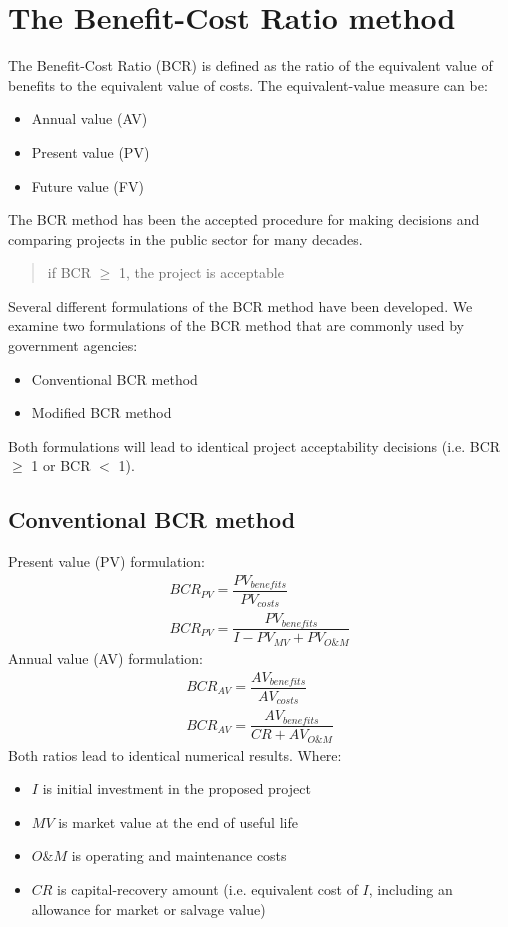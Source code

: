 \section{The Benefit-Cost Ratio method}
The Benefit-Cost Ratio (BCR) is defined as the ratio of the equivalent value of benefits to the equivalent value of costs. The equivalent-value measure can be:
\begin{itemize}
  \item Annual value (AV)
  \item Present value (PV)
  \item Future value (FV)
\end{itemize}
The BCR method has been the accepted procedure for making decisions and comparing projects in the public sector for many decades.
\begin{quote}
  if BCR $\geq$ 1, the project is acceptable
\end{quote}
Several different formulations of the BCR method have been developed. We examine two formulations of the BCR method that are commonly used by government agencies:
\begin{itemize}
  \item Conventional BCR method
  \item Modified BCR method
\end{itemize}
Both formulations will lead to identical project acceptability decisions (i.e. BCR $\geq$ 1 or BCR $<$ 1).
\subsection{Conventional BCR method}
Present value (PV) formulation:
\begin{gather}
  BCR_{PV} = \dfrac{PV_{benefits}}{PV_{costs}}\\
  BCR_{PV} = \dfrac{PV_{benefits}}{I- PV_{MV}+PV_{O\&M}}
\end{gather}
Annual value (AV) formulation:
\begin{gather}
  BCR_{AV} = \dfrac{AV_{benefits}}{AV_{costs}}\\
  BCR_{AV} = \dfrac{AV_{benefits}}{CR + AV_{O\&M}}
\end{gather}
Both ratios lead to identical numerical results. Where:
\begin{itemize}
  \item $I$ is initial investment in the proposed project
  \item $MV$ is market value at the end of useful life
  \item $O\&M$ is operating and maintenance costs
  \item $CR$ is capital-recovery amount (i.e. equivalent cost of $I$, including an allowance for market or salvage value)
\end{itemize}
